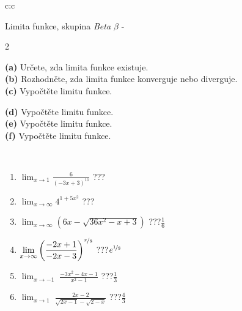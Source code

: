 \documentclass[10pt]{report}
\begin{document}
\begin{tabular}{c:c}
\begin{minipage}[c][104.5mm][t]{0.5\linewidth}
\begin{center}
\vspace{7mm}
{\huge Limita funkce, skupina \textit{Beta $\beta$} -}\\[5mm]
\begin{minipage}{0.95\linewidth}
\begin{center}
{\small \begin{multicols}{2} \raggedright
\textbf{(a)} Určete, zda limita funkce existuje. \\[1mm]
\textbf{(b)} Rozhodněte, zda limita funkce konverguje nebo diverguje. \\[1mm]
\textbf{(c)} Vypočtěte limitu funkce. \par \columnbreak
\textbf{(d)} Vypočtěte limitu funkce. \\[1mm]
\textbf{(e)} Vypočtěte limitu funkce. \\[1mm]
\textbf{(f)} Vypočtěte limitu funkce. \\[1mm]
\end{multicols}
}
\end{center}
\end{minipage}
\\[4mm]
\begin{minipage}{0.79\linewidth}
\begin{center}
\begin{varwidth}{\linewidth}
\begin{enumerate}
\normalsize
\item $\displaystyle\lim_{x\to1}{\frac{6}{(-3x+3)^{11}}}$\quad \dotfill\; ???\;\dotfill \quad {}
\item $\displaystyle\lim_{x\to\infty}{4^{1+5x^2}}$\quad \dotfill\; ???\;\dotfill \quad {}
\item $\displaystyle\lim_{x\to\infty}{\left(6x - \sqrt{36x^2-x+3}\right)}$\quad \dotfill\; ???\;\dotfill \quad $\frac{1}{6}$
\item $\displaystyle\lim_{x\to\infty}{\left( \frac{-2x+1}{-2x-3} \right)^{\nicefrac{x}{8}}}$\quad \dotfill\; ???\;\dotfill \quad $e^{\nicefrac{1}{8}}$
\item $\displaystyle\lim_{x\to -1}{\;\frac{-3x^2-4x-1}{x^2-1}}$\quad \dotfill\; ???\;\dotfill \quad $\frac{1}{3}$
\item $\displaystyle\lim_{x\to 1}{\;\frac{2x-2}{\sqrt{2x-1} - \sqrt{2-x}}}$\quad \dotfill\; ???\;\dotfill \quad $\frac{4}{3}$

\end{enumerate}
\end{varwidth}
\end{center}
\end{minipage}
\end{center}
\end{minipage}
\end{tabular}
\end{document}
